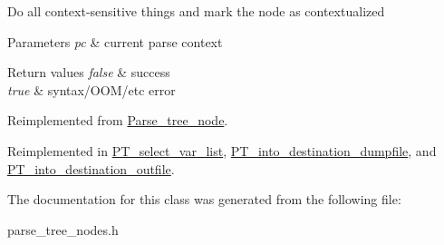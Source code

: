Do all context-\/sensitive things and mark the node as contextualized


\begin{DoxyParams}{Parameters}
{\em pc} & current parse context\\
\hline
\end{DoxyParams}

\begin{DoxyRetVals}{Return values}
{\em false} & success \\
\hline
{\em true} & syntax/\+O\+O\+M/etc error \\
\hline
\end{DoxyRetVals}


Reimplemented from \mbox{\hyperlink{classParse__tree__node_a22d93524a537d0df652d7efa144f23da}{Parse\+\_\+tree\+\_\+node}}.



Reimplemented in \mbox{\hyperlink{classPT__select__var__list_a5b792bf23c127377a3ff4fc30c298fcd}{P\+T\+\_\+select\+\_\+var\+\_\+list}}, \mbox{\hyperlink{classPT__into__destination__dumpfile_ab3870bce818779ff992c7025bad8d13d}{P\+T\+\_\+into\+\_\+destination\+\_\+dumpfile}}, and \mbox{\hyperlink{classPT__into__destination__outfile_a6cd3dd75a5259d8f8d5a838e8dac586e}{P\+T\+\_\+into\+\_\+destination\+\_\+outfile}}.



The documentation for this class was generated from the following file\+:\begin{DoxyCompactItemize}
\item 
parse\+\_\+tree\+\_\+nodes.\+h\end{DoxyCompactItemize}
